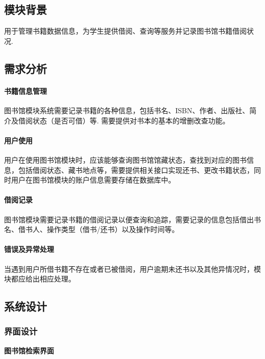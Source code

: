 \documentclass{article}
\begin{document}
\subsection{模块背景}
用于管理书籍数据信息，为学生提供借阅、查询等服务并记录图书馆书籍借阅状况.
\subsection{需求分析}

\paragraph{书籍信息管理}
图书馆模块系统需要记录书籍的各种信息，包括书名、ISBN、作者、出版社、简介及借阅状态（是否可借）等. 需要提供对书本的基本的增删改查功能。

\paragraph{用户使用}
用户在使用图书馆模块时，应该能够查询图书馆馆藏状态，查找到对应的图书信息，包括借阅状态、藏书地点等，需要提供相关接口实现还书、更改书籍状态，同时用户在图书馆模块的账户信息需要存储在数据库中。

\paragraph{借阅记录}
图书馆模块需要记录书籍的借阅记录以便查询和追踪，需要记录的信息包括借出书名、借书人、操作类型（借书/还书）以及操作时间等。

\paragraph{错误及异常处理}
当遇到用户所借书籍不存在或者已被借阅，用户逾期未还书以及其他异情况时，模块都应给出相应处理。

\subsection{系统设计}
\subsubsection{界面设计}

\begin{center}
\textbf{图书馆检索界面}
\end{center}
\end{document}
